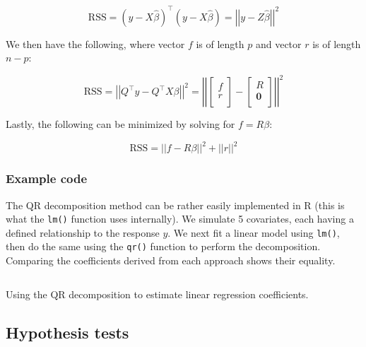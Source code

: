 \documentclass{report}
\begin{document}
\begin{equation}\label{eq:ols-rss-qr-decomp-1}
    \text{RSS} = \left(y - X\hat{\beta}\right)^\intercal \left(y - X\hat{\beta}\right) = \left|\left|y - Z\hat{\beta}\right|\right|^2
\end{equation}

We then have the following, where vector $f$ is of length $p$ and vector $r$ is of length $n-p$:

\begin{equation}\label{eq:ols-rss-qr-decomp-2}
    \text{RSS} = \left|\left|Q^\intercal y - Q^\intercal X\beta\right|\right|^2 = \left|\left|\begin{bmatrix}
        f \\
        r \\
    \end{bmatrix} - \begin{bmatrix}
        R \\
        \symbf{0} \\
    \end{bmatrix}\right|\right|^2
\end{equation}

Lastly, the following can be minimized by solving for $f = R\beta$:

\begin{equation}\label{eq:ols-rss-qr-decomp-3}
    \text{RSS} = ||f - R\beta||^2 + ||r||^2
\end{equation}

\subsubsection{Example code}

The QR decomposition method can be rather easily implemented in R (this is what the \texttt{lm()} function uses internally). We simulate 5 covariates, each having a defined relationship to the response $y$. We next fit a linear model using \texttt{lm()}, then do the same using the \texttt{qr()} function to perform the decomposition. Comparing the coefficients derived from each approach shows their equality. 

\begin{listing}[h!]
\inputminted{r}{Example-Code/qr_decomp_linear_model.R}
\caption{Using the QR decomposition to estimate linear regression coefficients.}
\label{listing:qr-regression-example}
\end{listing}

\subsection{Hypothesis tests}
\end{document}
